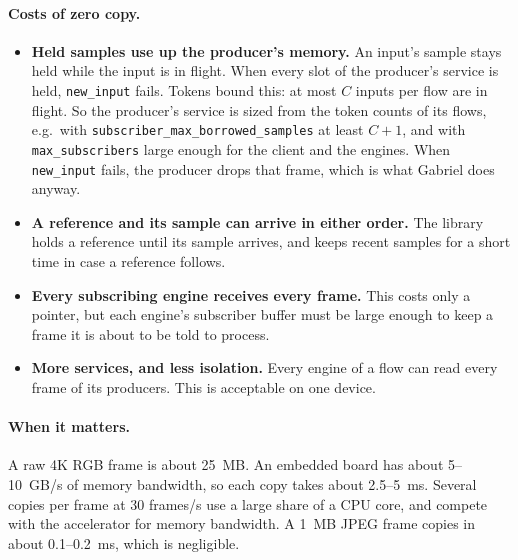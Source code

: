 \documentclass[11pt]{article}
\newcommand{\code}[1]{\texttt{#1}}
\begin{document}
\paragraph{Costs of zero copy.}
\begin{itemize}[nosep]
  \item \textbf{Held samples use up the producer's memory.} An input's sample
        stays held while the input is in flight. When every slot of the
        producer's service is held, \code{new\_input} fails. Tokens bound
        this: at most $C$ inputs per flow are in flight. So the producer's
        service is sized from the token counts of its flows, e.g.\ with
        \code{subscriber\_max\_borrowed\_samples} at least $C + 1$, and with
        \code{max\_subscribers} large enough for the client and the engines.
        When \code{new\_input} fails, the producer drops that frame, which is
        what Gabriel does anyway.
  \item \textbf{A reference and its sample can arrive in either order.} The
        library holds a reference until its sample arrives, and keeps recent
        samples for a short time in case a reference follows.
  \item \textbf{Every subscribing engine receives every frame.} This costs
        only a pointer, but each engine's subscriber buffer must be large
        enough to keep a frame it is about to be told to process.
  \item \textbf{More services, and less isolation.} Every engine of a flow can
        read every frame of its producers. This is acceptable on one device.
\end{itemize}

\paragraph{When it matters.} A raw 4K RGB frame is about 25~MB. An embedded
board has about 5--10~GB/s of memory bandwidth, so each copy takes about
2.5--5~ms. Several copies per frame at 30 frames/s use a large share of a CPU
core, and compete with the accelerator for memory bandwidth. A 1~MB JPEG frame
copies in about 0.1--0.2~ms, which is negligible.
\end{document}
